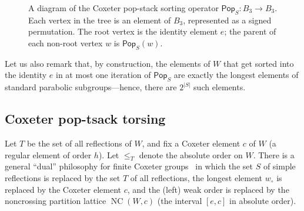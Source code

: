 \documentclass[ALCO,ThmDefs,Unicode,epreuves]{cedram}
\newcommand{\pop}{\mathsf{Pop}}
\newcommand{\wo}{w_\circ}
\DeclareMathOperator{\NC}{NC}
\begin{document}
\begin{figure}[htbp]
\begin{center}
{}
\end{center}
\caption{A diagram of the Coxeter pop-stack sorting operator $\pop_S:B_3\to B_3$. Each vertex in the tree is an element of $B_3$, represented as a signed permutation. The root vertex is the identity element $e$; the parent of each non-root vertex $w$ is $\pop_S(w)$. }
\label{fig:b3}
\end{figure}



Let us also remark that, by construction, the elements of $W$ that get sorted into the identity $e$ in at most one iteration of $\pop_S$ are exactly the longest elements of standard parabolic subgroups---hence, there are $2^{|S|}$ such elements. 



\subsection{Coxeter pop-tsack torsing}
Let $T$ be the set of all reflections of $W$, and fix a Coxeter element $c$ of $W$ (a regular element of order $h$).  Let $\leq_T$ denote the absolute order on $W$. There is a general ``dual'' philosophy for finite Coxeter groups~\cite{bessis2003dual} in which the set $S$ of simple reflections is replaced by the set $T$ of all reflections, the longest element $\wo$ is replaced by the Coxeter element $c$, and the (left) weak order is replaced by the noncrossing partition lattice $\NC(W,c)$ (the interval $[e,c]$ in absolute order).
\end{document}
